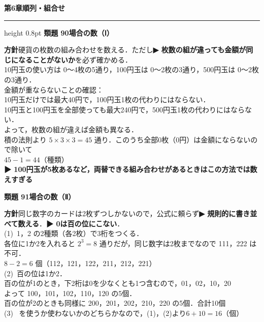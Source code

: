 \documentclass[a4paper,11pt]{ltjsarticle}
\newcommand{\ans}[2]{\Needspace{5\baselineskip}\vspace{6pt}%
  {\sffamily\bfseries 類題 #1\quad #2}\par}
\newcommand{\point}[1]{\textsf{\bfseries ▶ #1}}
\newcommand{\shouans}[2]{\Needspace{8\baselineskip}\vspace{10pt}\markboth{解答\quad #1\quad #2}{}%
  {\sffamily\bfseries\Large #1\quad #2\par}\vspace{2pt}\hrule height 0.8pt\vspace{2pt}}
\begin{document}
\shouans{第6章}{順列・組合せ}
\ans{90}{場合の数（Ⅰ）}
\begin{kai}
\textbf{方針}\quad 硬貨の枚数の組み合わせを数える．ただし\point{枚数の組が違っても金額が同じになることがないか}を必ず確かめる．\\[2pt]
10円玉の使い方は 0〜4枚の5通り，100円玉は 0〜2枚の3通り，500円玉は 0〜2枚の3通り．\\[2pt]
金額が重ならないことの確認：\\
\hspace*{1.5em}10円玉だけでは最大40円で，100円玉1枚の代わりにはならない．\\
\hspace*{1.5em}10円玉と100円玉を全部使っても最大240円で，500円玉1枚の代わりにはならない．\\
\hspace*{1.5em}よって，枚数の組が違えば金額も異なる．\\[2pt]
積の法則より $5\times3\times3=45$ 通り．このうち全部0枚（0円）は金額にならないので除いて\\
\hspace*{1.5em}$45-1=44$（種類）\\
\point{100円玉が5枚あるなど，両替できる組み合わせがあるときはこの方法では数えすぎる}
\end{kai}

\ans{91}{場合の数（Ⅱ）}
\begin{kai}
\textbf{方針}\quad 同じ数字のカードは2枚ずつしかないので，公式に頼らず\point{規則的に書き並べて数える}．\point{0は百の位にこない}．\\[2pt]
(1)\ 1，2 の2種類（各2枚）で3桁をつくる．\\
\hspace*{1.5em}各位に1か2を入れると $2^3=8$ 通りだが，同じ数字は2枚までなので 111，222 は不可．\\
\hspace*{1.5em}$8-2=6$ 個（112，121，122，211，212，221）\\[2pt]
(2)\ 百の位は1か2．\\
\hspace*{1.5em}百の位が1のとき，下2桁は0を少なくとも1つ含むので，01，02，10，20\\
\hspace*{1.5em}よって 100，101，102，110，120 の5個．\\
\hspace*{1.5em}百の位が2のときも同様に 200，201，202，210，220 の5個．\quad 合計\quad 10個\\[2pt]
(3)\  を使うか使わないかのどちらかなので，(1)，(2)より\quad $6+10=16$（個）
\end{kai}
\end{document}
